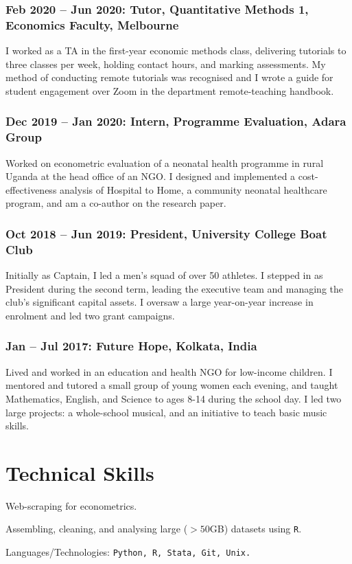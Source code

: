 \documentclass[a4]{article}
\renewenvironment{itemize}{
  \begin{list}{}{
    \setlength{\leftmargin}{1.5em}
  }
}{
  \end{list}
}
\begin{document}
\subsubsection*{Feb 2020 -- Jun 2020: Tutor, Quantitative Methods 1, Economics Faculty, Melbourne}
I worked as a TA in the first-year economic methods class, delivering tutorials to three classes per week, holding contact hours, and marking assessments. My method of conducting remote tutorials was recognised and I wrote a guide for student engagement over Zoom in the department remote-teaching handbook.

\subsubsection*{Dec 2019 -- Jan 2020: Intern, Programme Evaluation, Adara Group}
Worked on econometric evaluation of a neonatal health programme in rural Uganda at the head office of an NGO. I designed and implemented a cost-effectiveness analysis of Hospital to Home, a community neonatal healthcare program, and am a co-author on the research paper.
\subsubsection*{Oct 2018 -- Jun 2019: President, University College Boat Club}
Initially as Captain, I led a men’s squad of over 50 athletes. I stepped in as President during the second term, leading the executive team and managing the club’s significant capital assets. I oversaw a large year-on-year increase in enrolment and led two grant campaigns.
\subsubsection*{Jan -- Jul 2017: Future Hope, Kolkata, India}
Lived and worked in an education and health NGO for low-income children. I mentored and tutored a small group of young women each evening, and taught Mathematics, English, and Science to ages 8-14 during the school day. I led two large projects: a whole-school musical, and an initiative to teach basic music skills. 
\section*{Technical Skills}
\begin{itemize}
	\item Web-scraping for econometrics.
	\item Assembling, cleaning, and analysing large (\(>50\)GB) datasets using \texttt{R}.
	\item Languages/Technologies: \tt Python, R, Stata, Git, Unix.
\end{itemize}
\end{document}
